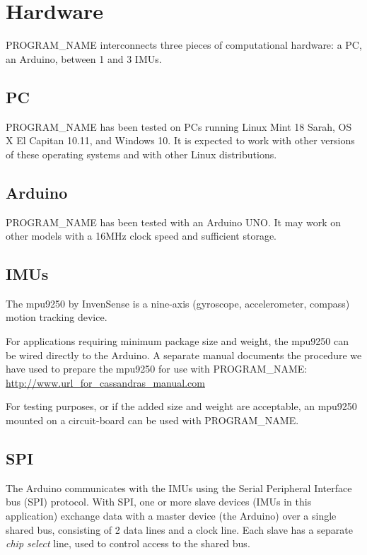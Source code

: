 \documentclass[11pt,letterpaper,article,oneside]{memoir}
\newcommand{\name}{PROGRAM\_NAME}
\begin{document}

\chapter{Hardware}

\name{} interconnects three pieces of computational hardware: a PC, an Arduino,
between 1 and 3 IMUs.

\section{PC}
\name{} has been tested on PCs running Linux Mint 18 Sarah, OS X El Capitan
10.11, and Windows 10. It is expected to work with other versions of these
operating systems and with other Linux distributions.

\section{Arduino}
\name{} has been tested with an Arduino UNO. It may work on other
models with a 16MHz clock speed and sufficient storage.


\section{IMUs}
The mpu9250 by InvenSense is a nine-axis (gyroscope, accelerometer, compass)
motion tracking device.

For applications requiring minimum package size and weight,
the mpu9250 can be wired directly to the Arduino. A separate manual
documents the procedure we have used to prepare the mpu9250 for use with
\name{}:
\url{http://www.url_for_cassandras_manual.com}

For testing purposes, or if the added size and weight are acceptable, an mpu9250
mounted on a circuit-board can be used with \name{}.


\section{SPI}
The Arduino communicates with the IMUs using the Serial Peripheral Interface bus
(SPI) protocol. With SPI, one or more slave devices (IMUs in this application)
exchange data with a master device (the Arduino) over a single shared bus,
consisting of 2 data lines and a clock line. Each slave has a separate
\emph{chip select} line, used to control access to the shared bus.
\end{document}
